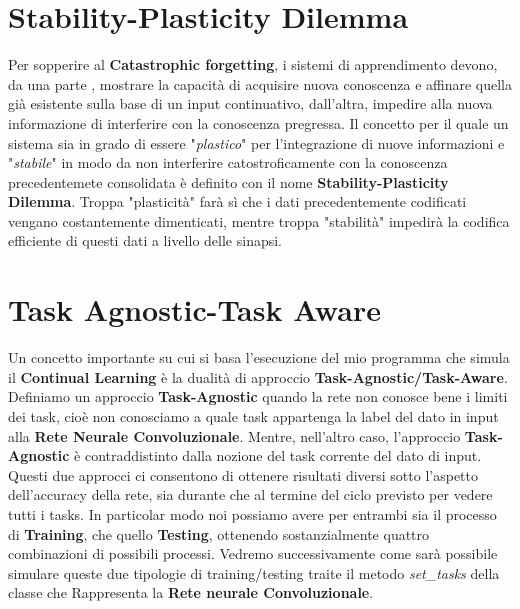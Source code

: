 \section{Stability-Plasticity Dilemma}
Per sopperire al \textbf{Catastrophic forgetting}, i sistemi di apprendimento devono, da una parte , mostrare la capacità di acquisire nuova conoscenza e affinare quella già esistente sulla base di un input continuativo, dall'altra, impedire alla nuova informazione di interferire con la conoscenza pregressa.
Il concetto  per il quale un sistema sia in grado di essere "\textit{plastico}" per l'integrazione di nuove informazioni e "\textit{stabile}"
in modo da non interferire catostroficamente con la conoscenza precedentemete consolidata è definito con il nome \textbf{Stability-Plasticity Dilemma}.\newline
Troppa "plasticità" farà sì che i dati precedentemente codificati vengano costantemente dimenticati, mentre troppa "stabilità" impedirà la codifica efficiente di questi dati a livello delle sinapsi.
\section{Task Agnostic-Task Aware}
Un concetto importante su cui si basa l'esecuzione del mio programma che simula il \textbf{Continual Learning} è la dualità di approccio \textbf{Task-Agnostic/Task-Aware}.
Definiamo un approccio \textbf{Task-Agnostic} quando la rete non conosce bene i limiti dei task, cioè non conosciamo a quale task appartenga la label del dato in input alla \textbf{Rete Neurale Convoluzionale}. Mentre, nell'altro caso, l'approccio  \textbf{Task-Agnostic} è contraddistinto dalla nozione del task corrente del dato di input.\newline
Questi due approcci ci consentono di ottenere risultati diversi sotto l'aspetto dell'accuracy della rete, sia durante che al termine del ciclo previsto per vedere tutti i tasks. In particolar modo noi possiamo avere per entrambi sia il processo di \textbf{Training}, che quello \textbf{Testing}, ottenendo sostanzialmente quattro combinazioni di possibili processi.\newline
Vedremo successivamente come sarà possibile simulare queste due tipologie di training/testing traite il metodo \textit{set\_tasks} della classe che Rappresenta la 
\textbf{Rete neurale Convoluzionale}.
